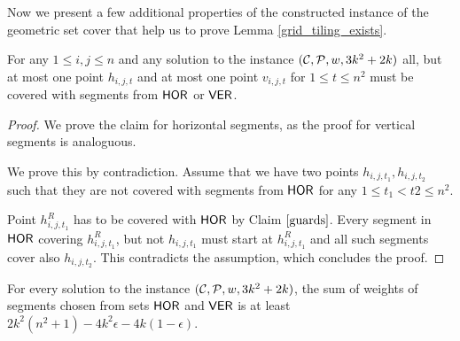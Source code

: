 Now we present a few additional properties of the constructed instance
of the geometric set cover that help us to prove
Lemma \ref{grid_tiling_exists}.

\begin{claim}
\label{one_diag_in_square}
For any $1 \le i, j \le n$
and any solution to the instance $(\mathcal{C}, \mathcal{P}, w, 3k^2+2k)$
all, but at most one point $h_{i, j, t}$
and at most one point $v_{i, j, t}$
for $1 \le t \le n^2$
must be
covered with segments from $\mathsf{HOR}$ or $\mathsf{VER}$.
\end{claim}

\begin{proof}
We prove the claim for horizontal segments,
as the proof for vertical segments is analoguous.

We prove this by contradiction. Assume that we
have two points $h_{i,j,t_1}, h_{i,j,t_2}$
such that they are not covered with segments from $\mathsf{HOR}$
for any $1 \le t_1 < t2 \le n^2$.

Point $h^R_{i, j, t_1}$ has to be covered with $\mathsf{HOR}$
by Claim $\ref{guards}$.
Every segment in $\mathsf{HOR}$ covering $h^R_{i, j, t_1}$,
but not $h_{i,j,t_1}$ must start at $h^R_{i, j, t_1}$
and all such segments cover also $h_{i, j, t_2}$.
This contradicts the assumption, which concludes the proof.
\end{proof}

\begin{lemma}
\label{vertical_horizontal_sum}
For every solution to the instance $(\mathcal{C}, \mathcal{P}, w, 3k^2+2k)$,
the sum of weights of segments chosen
from sets $\mathsf{HOR}$ and $\mathsf{VER}$ is at least
$2k^2(n^2+1) -4k^2\epsilon -4k(1-\epsilon)$.
\end{lemma}

